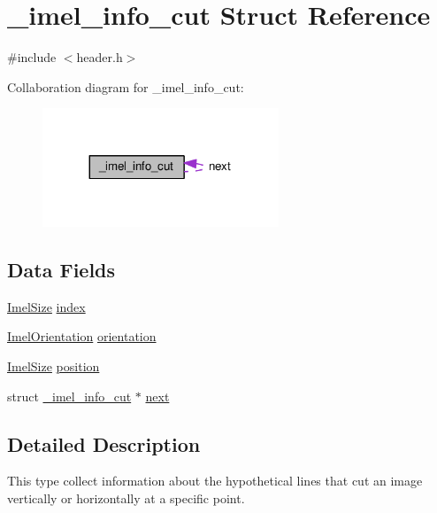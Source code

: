 \hypertarget{struct__imel__info__cut}{}\section{\+\_\+imel\+\_\+info\+\_\+cut Struct Reference}
\label{struct__imel__info__cut}


{\ttfamily \#include $<$header.\+h$>$}



Collaboration diagram for \+\_\+imel\+\_\+info\+\_\+cut\+:
\nopagebreak
\begin{figure}[H]
\begin{center}
\leavevmode
\includegraphics[width=200pt]{struct__imel__info__cut__coll__graph}
\end{center}
\end{figure}
\subsection*{Data Fields}
{\bf }\par
\begin{DoxyCompactItemize}
\item 
\hyperlink{header_8h_af8a2b40c34eeed326846d0098ea84ec2}{Imel\+Size} \hyperlink{struct__imel__info__cut_ae436b332b23852dd64b64b65b6410f64}{index}
\item 
\hyperlink{header_8h_aef27fcac7a96d118b3c3194c2577049f}{Imel\+Orientation} \hyperlink{struct__imel__info__cut_a3c2a7e5ecd568b3742a1ac0cdbc9ae9d}{orientation}
\item 
\hyperlink{header_8h_af8a2b40c34eeed326846d0098ea84ec2}{Imel\+Size} \hyperlink{struct__imel__info__cut_a6690e6207a17f6407ec469699bc5d7d0}{position}
\item 
struct \hyperlink{struct__imel__info__cut}{\+\_\+imel\+\_\+info\+\_\+cut} $\ast$ \hyperlink{struct__imel__info__cut_a3e0e1c8db6cdc22b7f4247e0b295a0d9}{next}
\end{DoxyCompactItemize}



\subsection{Detailed Description}
This type collect information about the hypothetical lines that cut an image vertically or horizontally at a specific point.

